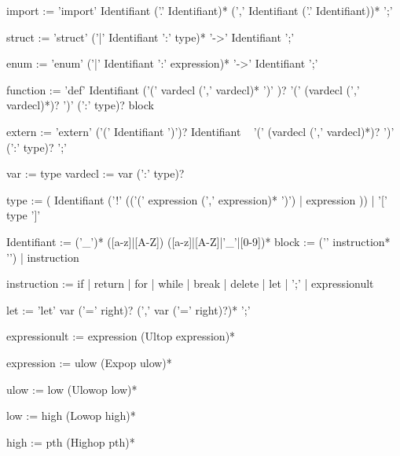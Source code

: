 \documentclass[a4paper, 11pt]{article}
\begin{document}
\begin{boxedverbatim}

  import := 'import' Identifiant ('.' Identifiant)*
                                 (',' Identifiant ('.' Identifiant))* ';'

  struct := 'struct' ('|' Identifiant ':' type)* '->' Identifiant ';'

  enum := 'enum' ('|' Identifiant ':' expression)* '->' Identifiant ';'

  function := 'def' Identifiant ('(' vardecl (',' vardecl)* ')' )?
                                '(' (vardecl (',' vardecl)*)? ')'
                                (':' type)? block

  extern := 'extern' ('(' Identifiant ')')? Identifiant
                                            '(' (vardecl (',' vardecl)*)? ')'
                                             (':' type)? ';'

  var := type
  vardecl := var (':' type)?

  type := ( Identifiant ('!' (('(' expression (',' expression)* ')') | expression ))
          | '[' type ']'
  
  Identifiant := ('\_')* ([a-z]|[A-Z]) ([a-z]|[A-Z]|'\_'|[0-9])*
  block := ('{' instruction* '}') | instruction

  instruction := if
                 | return
                 | for
                 | while
                 | break
                 | delete
                 | let
                 | ';'
                 | expressionult


  let := 'let' var ('=' right)? (',' var ('=' right)?)* ';'              

  expressionult := expression (Ultop expression)*

  expression := ulow (Expop ulow)*

  ulow := low (Ulowop low)*

  low := high (Lowop high)*

  high := pth (Highop pth)*
\end{boxedverbatim}
         

\pagebreak
\end{document}
